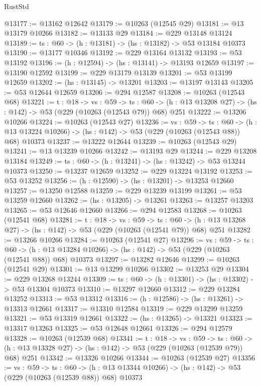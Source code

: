 \begin{lexlean}{RustStd}
\begin{coremodule}
@13177 := @13162 @12642
@13179 := @10263 (@12545 @29)
@13181 := @13 @13179 @10266
@13182 := @13133 @29
@13184 := @229 @13148 @13124
@13189 := {ts : @60} -> (h : @13181) -> (hs : @13182) -> @53 @13184 @10373
@13190 := @13177 @10346
@13192 := @229 @13164 @13132
@13193 := @53 @13192
@13196 := (h : @12594) -> (hs : @13141) -> @13193 @12659
@13197 := @13190 @12592
@13199 := @229 @13179 @13139
@13201 := @53 @13199 @12659
@13202 := (hs : @13145) -> @13201
@13203 := @13197 @13143
@13205 := @53 @12644 @12659
@13206 := @294 @12587
@13208 := @10263 (@12543 @68)
@13221 := {t : @18} ->
  {vs : @59} ->
  {ts : @60} -> (h : @13 @13208 @27) -> (hs : @142) -> @53 (@229 (@10263 (@12543 @79)) @68) @251
@13222 := @13206 @10266
@13224 := @10263 (@12543 @27)
@13236 := {vs : @59} ->
  {ts : @60} ->
  (h : @13 @13224 @10266) -> (hs : @142) -> @53 (@229 (@10263 (@12543 @88)) @68) @10373
@13237 := @13222 @12644
@13239 := @10263 (@12543 @29)
@13241 := @13 @13239 @10266
@13242 := @13193 @29
@13244 := @229 @13208 @13184
@13249 := {ts : @60} -> (h : @13241) -> (hs : @13242) -> @53 @13244 @10373
@13250 := @13237 @12659
@13252 := @229 @13224 @13192
@13253 := @53 @13252
@13256 := (h : @12590) -> (hs : @13201) -> @13253 @12660
@13257 := @13250 @12588
@13259 := @229 @13239 @13199
@13261 := @53 @13259 @12660
@13262 := (hs : @13205) -> @13261
@13263 := @13257 @13203
@13265 := @53 @12646 @12660
@13266 := @294 @12583
@13268 := @10263 (@12541 @68)
@13281 := {t : @18} ->
  {vs : @59} ->
  {ts : @60} -> (h : @13 @13268 @27) -> (hs : @142) -> @53 (@229 (@10263 (@12541 @79)) @68) @251
@13282 := @13266 @10266
@13284 := @10263 (@12541 @27)
@13296 := {vs : @59} ->
  {ts : @60} ->
  (h : @13 @13284 @10266) -> (hs : @142) -> @53 (@229 (@10263 (@12541 @88)) @68) @10373
@13297 := @13282 @12646
@13299 := @10263 (@12541 @29)
@13301 := @13 @13299 @10266
@13302 := @13253 @29
@13304 := @229 @13268 @13244
@13309 := {ts : @60} -> (h : @13301) -> (hs : @13302) -> @53 @13304 @10373
@13310 := @13297 @12660
@13312 := @229 @13284 @13252
@13313 := @53 @13312
@13316 := (h : @12586) -> (hs : @13261) -> @13313 @12661
@13317 := @13310 @12584
@13319 := @229 @13299 @13259
@13321 := @53 @13319 @12661
@13322 := (hs : @13265) -> @13321
@13323 := @13317 @13263
@13325 := @53 @12648 @12661
@13326 := @294 @12579
@13328 := @10263 (@12539 @68)
@13341 := {t : @18} ->
  {vs : @59} ->
  {ts : @60} -> (h : @13 @13328 @27) -> (hs : @142) -> @53 (@229 (@10263 (@12539 @79)) @68) @251
@13342 := @13326 @10266
@13344 := @10263 (@12539 @27)
@13356 := {vs : @59} ->
  {ts : @60} ->
  (h : @13 @13344 @10266) -> (hs : @142) -> @53 (@229 (@10263 (@12539 @88)) @68) @10373

\end{coremodule}
\end{lexlean}
